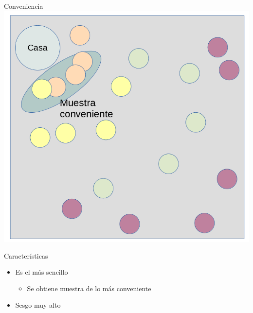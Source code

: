 \documentclass[
  11pt,
  ignorenonframetext,
]{beamer}
\providecommand{\tightlist}{%
  \setlength{\itemsep}{0pt}\setlength{\parskip}{0pt}}
\begin{document}
\begin{frame}{Conveniencia}
\protect\hypertarget{conveniencia}{}
\includegraphics{Figuras-tecnicas/Conveniencia.png}
\end{frame}

\begin{frame}{Características}
\protect\hypertarget{caracteruxedsticas-2}{}
\begin{itemize}
\item
  Es el más sencillo

  \begin{itemize}
  \tightlist
  \item
    Se obtiene muestra de lo más conveniente
  \end{itemize}
\item
  Sesgo muy alto
\end{itemize}
\end{frame}
\end{document}
